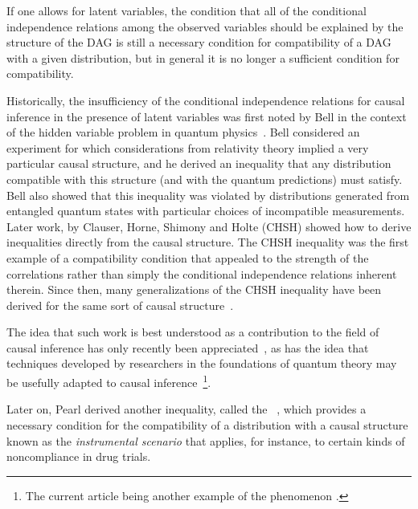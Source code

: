 If one allows for latent variables, the condition that all of the conditional independence relations among the observed variables should be explained by the structure of the DAG is still a necessary condition for compatibility of a DAG with a given distribution, but in general it is no longer a sufficient condition for compatibility. 

Historically, the insufficiency of the conditional independence relations for causal inference in the presence of latent variables was first noted by Bell in the context of the hidden variable problem in quantum physics~\cite{bell1964einstein}. Bell considered an experiment for which considerations from relativity theory implied a very particular causal structure, and he derived an inequality that any distribution compatible with this structure (and with the quantum predictions) must satisfy.  Bell also showed that this inequality was violated by distributions generated from entangled quantum states with particular choices of incompatible measurements.
Later work, by Clauser, Horne, Shimony and Holte (CHSH) \cite{CHSHOriginal} showed how to derive inequalities directly from the causal structure.  The CHSH inequality was the first example of a compatibility condition that appealed to the strength of the correlations rather than simply the conditional independence relations inherent therein.  Since then, many generalizations of the CHSH inequality have been derived for the same sort of causal structure~\cite{Brunner2013Bell}.


The idea that such work is best understood as a contribution to the field of causal inference has only recently been appreciated~\cite{WoodSpekkens,fritz2012bell,pusey2014gdag,BeyondBellII}, as has the idea that techniques developed by researchers in the foundations of quantum theory may be usefully adapted to causal inference~\footnote{The current article being another example of the phenomenon \cite{ChavesNoSignalling,chaves2014informationinference,weilenmann2016entropic,kela2016covariance,ChavesPolynomial,TavakoliStarNetworks,RossetNetworks,TavakoliNoncyclicNetworks}.}.

Later on, Pearl derived another inequality, called the ~\cite{pearl1995instrumental}, which provides a necessary condition for the compatibility of a distribution with a causal structure 
known as the \emph{instrumental scenario} that applies, for instance, to certain kinds of noncompliance in drug trials.

